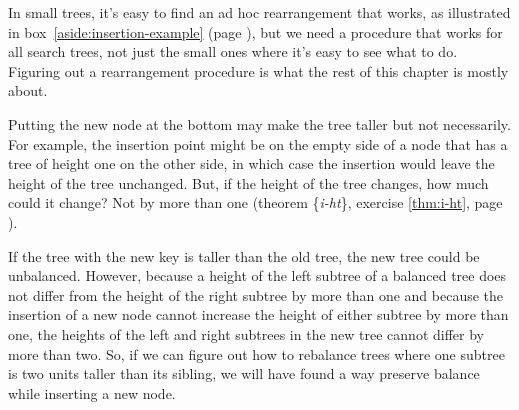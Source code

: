 In small trees, it's easy to find an ad hoc rearrangement that works, %
as illustrated in box~\ref{aside:insertion-example}
(page \pageref{aside:insertion-example}),
but we need a procedure that works for all search trees,
not just the small ones where it's easy to see what to do. %
Figuring out a rearrangement procedure is what the rest
of this chapter is mostly about.

Putting the new node at the bottom may make the tree taller
but not necessarily.
For example, the insertion point might be on the
empty side of a node that has a tree of height one on the other side,
in which case the insertion would leave the height of the tree unchanged.
But, if the height of the tree changes,
how much could it change?
Not by more than one
(theorem \{\emph{i-ht}\}, exercise \ref{thm:i-ht}, page \pageref{thm:i-ht}).

If the tree with the new key is taller than the old tree,
the new tree could be unbalanced.
However, because a height of the left subtree of a
balanced tree does not differ from the height of
the right subtree by more than one
and because the insertion of a new node cannot increase
the height of either subtree by more than one,
the heights of the left and right subtrees in the new tree
cannot differ by more than two.
So, if we can figure out how to rebalance trees where
one subtree is two units taller than its sibling,
we will have found a way preserve balance
while inserting a new node.

